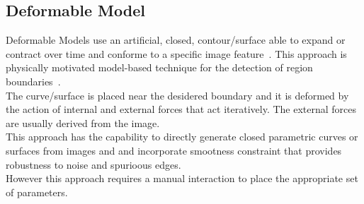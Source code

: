 \documentclass{standalone}
\begin{document}
		\subsection{Deformable Model}
			Deformable Models use an artificial, closed, contour/surface able to expand or contract over time and conforme to a specific image feature~\cite{INP:Withey}. This approach is physically motivated model-based technique for the detection of region boundaries~\cite{ART:Pham}.\\
			The curve/surface is placed near the desidered boundary and it is deformed by the action of internal and external forces that act iteratively. The external forces are usually derived from the image.\\
			This approach has the capability to directly generate closed parametric curves or surfaces from images and  and incorporate smootness constraint that provides robustness to noise and spurioous edges. \\
			However this approach requires a manual interaction to place the appropriate set of parameters.   
	
\end{document}

